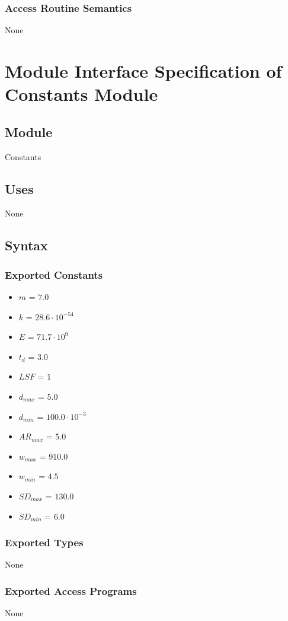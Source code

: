 \documentclass[12pt]{article}
\begin{document}
\subsubsection{Access Routine Semantics}
\label{Sec:AccRoutSemantics}
None
\section{Module Interface Specification of Constants Module}
\label{Sec:Constants}
\subsection{Module}
\label{Sec:Module}
Constants
\subsection{Uses}
\label{Sec:Uses}
None
\subsection{Syntax}
\label{Sec:Syntax}
\subsubsection{Exported Constants}
\label{Sec:ExpConstants}
\begin{itemize}
\item{$m$ = $7.0$}
\item{$k$ = $28.6\cdot{}10^{-54}$}
\item{$E$ = $71.7\cdot{}10^{9}$}
\item{${t_{d}}$ = $3.0$}
\item{$LSF$ = $1$}
\item{${d_{max}}$ = $5.0$}
\item{${d_{min}}$ = $100.0\cdot{}10^{-3}$}
\item{${AR_{max}}$ = $5.0$}
\item{${w_{max}}$ = $910.0$}
\item{${w_{min}}$ = $4.5$}
\item{${SD_{max}}$ = $130.0$}
\item{${SD_{min}}$ = $6.0$}
\end{itemize}
\subsubsection{Exported Types}
\label{Sec:ExpTypes}
None
\subsubsection{Exported Access Programs}
\label{Sec:ExpAccPrograms}
None
\end{document}
